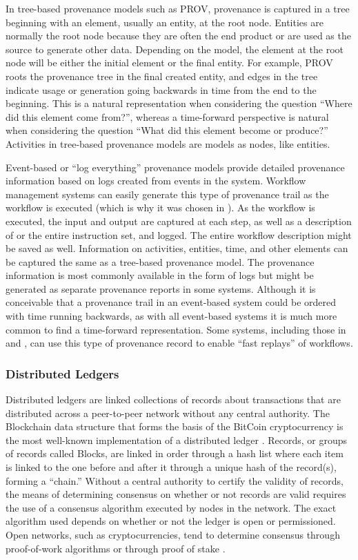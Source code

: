In tree-based provenance models such as PROV, provenance is captured in a tree
beginning with an element, usually an entity, at the root node. Entities are
normally the root node because they are often the end product or are used as the
source to generate other data. Depending on the model, the element at the root
node will be either the initial element or the final entity. For example, PROV
roots the provenance tree in the final created entity, and edges in the tree
indicate usage or generation going backwards in time from the end to the
beginning. This is a natural representation when considering the question
``Where did this element come from?'', whereas a time-forward perspective is
natural when considering the question ``What did this element become or
produce?'' Activities in tree-based provenance models are models as nodes, like
entities.

Event-based or ``log everything'' provenance models provide detailed provenance
information based on logs created from events in the system. Workflow management
systems can easily generate this type of provenance trail as the workflow is
executed (which is why it was chosen in \cite{billings_eclipse_2018}). As the
workflow is executed, the input and output are captured at each step, as well as
a description of or the entire instruction set, and logged. The entire workflow
description might be saved as well. Information on activities, entities, time,
and other elements can be captured the same as a tree-based provenance model.
The provenance information is most commonly available in the form of logs but
might be generated as separate provenance reports in some systems. Although it
is conceivable that a provenance trail in an event-based system could be ordered
with time running backwards, as with all event-based systems it is much more
common to find a time-forward representation. Some systems, including those in
\cite{billings_eclipse_2018} and \cite{altintas_provenance_2006}, can use this
type of provenance record to enable ``fast replays'' of workflows.

\subsubsection{Distributed Ledgers}
Distributed ledgers are linked collections of records about transactions that
are distributed across a peer-to-peer network without any central authority. The
Blockchain data structure that forms the basis of the BitCoin cryptocurrency is
the most well-known implementation of a distributed ledger
\cite{nakamoto_bitcoin:_nodate}. Records, or groups of records called Blocks,
are linked in order through a hash list where each item is linked to the one
before and after it through a unique hash of the record(s), forming a ``chain.''
Without a central authority to certify the validity of records, the means of
determining consensus on whether or not records are valid requires the use of a
consensus algorithm executed by nodes in the network. The exact algorithm used
depends on whether or not the ledger is open or permissioned. Open networks,
such as cryptocurrencies, tend to determine consensus through proof-of-work
algorithms \cite{nakamoto_bitcoin:_nodate} or through proof of stake
\cite{noauthor_proof--stake_2018}.

